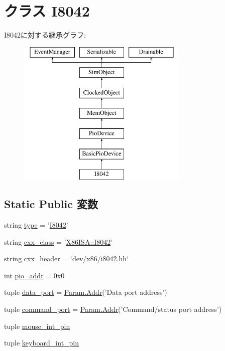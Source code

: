 \hypertarget{classI8042_1_1I8042}{
\section{クラス I8042}
\label{classI8042_1_1I8042}
}
I8042に対する継承グラフ:\begin{figure}[H]
\begin{center}
\leavevmode
\includegraphics[height=7cm]{classI8042_1_1I8042}
\end{center}
\end{figure}
\subsection*{Static Public 変数}
\begin{DoxyCompactItemize}
\item 
string \hyperlink{classI8042_1_1I8042_acce15679d830831b0bbe8ebc2a60b2ca}{type} = '\hyperlink{classI8042_1_1I8042}{I8042}'
\item 
string \hyperlink{classI8042_1_1I8042_a58cd55cd4023648e138237cfc0822ae3}{cxx\_\-class} = '\hyperlink{classX86ISA_1_1I8042}{X86ISA::I8042}'
\item 
string \hyperlink{classI8042_1_1I8042_a17da7064bc5c518791f0c891eff05fda}{cxx\_\-header} = \char`\"{}dev/x86/i8042.hh\char`\"{}
\item 
int \hyperlink{classI8042_1_1I8042_a659450bdbf05cdba8edf24c47df67671}{pio\_\-addr} = 0x0
\item 
tuple \hyperlink{classI8042_1_1I8042_a9b7aa5f120140d0f44db206487c7961c}{data\_\-port} = \hyperlink{base_2types_8hh_af1bb03d6a4ee096394a6749f0a169232}{Param.Addr}('Data port address')
\item 
tuple \hyperlink{classI8042_1_1I8042_a7d31dff5af4e58bcf7a6e67166bf1ac3}{command\_\-port} = \hyperlink{base_2types_8hh_af1bb03d6a4ee096394a6749f0a169232}{Param.Addr}('Command/status port address')
\item 
tuple \hyperlink{classI8042_1_1I8042_a03f9ac31fac237cf50c3009c7c14a199}{mouse\_\-int\_\-pin}
\item 
tuple \hyperlink{classI8042_1_1I8042_a0e4da7cae6bd43fb05053e39707bdc16}{keyboard\_\-int\_\-pin}
\end{DoxyCompactItemize}


